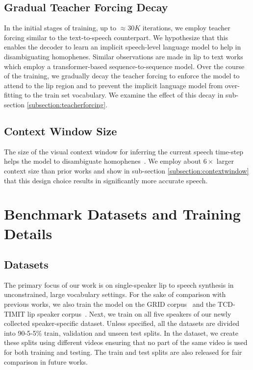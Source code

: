 \documentclass[10pt,twocolumn,letterpaper]{article}
\begin{document}
\subsection{Gradual Teacher Forcing Decay}
In the initial stages of training, up to $\approx30K$ iterations, we employ teacher forcing similar to the text-to-speech counterpart. We hypothesize that this enables the decoder to learn an implicit speech-level language model to help in disambiguating homophenes. Similar observations are made in lip to text works~\cite{Afouras2018DeepLR} which employ a transformer-based sequence-to-sequence model. Over the course of the training, we gradually decay the teacher forcing to enforce the model to attend to the lip region and to prevent the implicit language model from over-fitting to the train set vocabulary. We examine the effect of this decay in sub-section \ref{subsection:teacherforcing}.

\subsection{Context Window Size}
The size of the visual context window for inferring the current speech time-step helps the model to disambiguate homophenes~\cite{ephrat2017vid2speech}. We employ about $6\times$ larger context size than prior works and show in sub-section \ref{subsection:contextwindow} that this design choice results in significantly more accurate speech.



\section{Benchmark Datasets and Training Details}
\label{section:training_details}
\subsection{Datasets}
The primary focus of our work is on single-speaker lip to speech synthesis in unconstrained, large vocabulary settings. For the sake of comparison with previous works, we also train the \modelname model on the GRID corpus~\cite{cooke2006audio} and the TCD-TIMIT lip speaker corpus~\cite{harte2015tcd}. Next, we train on all five speakers of our newly collected speaker-specific \modelname dataset. Unless specified, all the datasets are divided into 90-5-5\% train, validation and unseen test splits. In the \modelname dataset, we create these splits using different videos ensuring that no part of the same video is used for both training and testing. The train and test splits are also released for fair comparison in future works.
\end{document}
